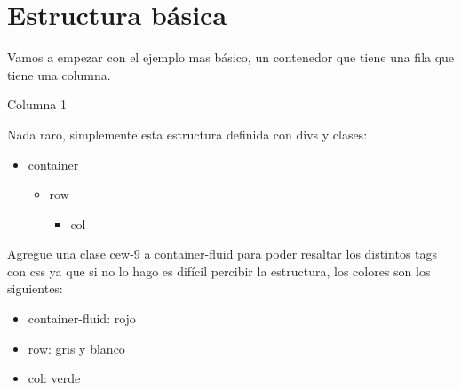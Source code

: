 \documentclass[letterpaper,10pt,spanish]{sphinxmanual}
\begin{document}
\section{Estructura básica}
\label{\detokenize{filas-columnas:estructura-basica}}
Vamos a empezar con el ejemplo mas básico, un contenedor que tiene una fila
que tiene una columna.



%
\begin{sphinxVerbatim}[commandchars=\\\{\}]
 
  
   
    Columna 1
\end{sphinxVerbatim}

Nada raro, simplemente esta estructura definida con divs y clases:
\begin{itemize}
\item {} 
container
\begin{itemize}
\item {} 
row
\begin{itemize}
\item {} 
col

\end{itemize}

\end{itemize}

\end{itemize}

Agregue una clase cew-9 a container-fluid para poder resaltar los distintos tags con
css ya que si no lo hago es difícil percibir la estructura, los colores son los
siguientes:
\begin{itemize}
\item {} 
container-fluid: rojo

\item {} 
row: gris y blanco

\item {} 
col: verde

\end{itemize}
\end{document}
